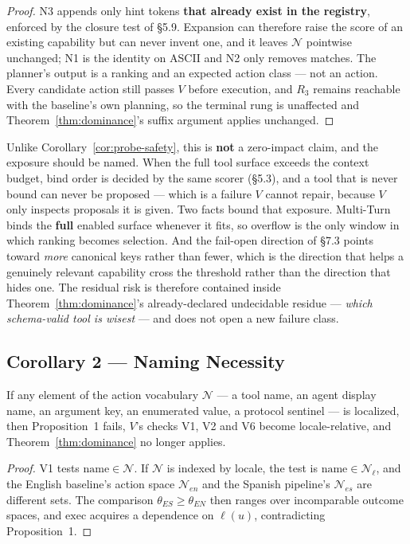 \begin{proof}
N3 appends only hint tokens \textbf{that already exist in the registry},
enforced by the closure test of \S5.9. Expansion can therefore raise the score
of an existing capability but can never invent one, and it leaves $\mathcal{N}$
pointwise unchanged; N1 is the identity on ASCII and N2 only removes matches.
The planner's output is a ranking and an expected action class --- not an
action. Every candidate action still passes $V$ before execution, and $R_3$
remains reachable with the baseline's own planning, so the terminal rung is
unaffected and Theorem~\ref{thm:dominance}'s suffix argument applies unchanged.
\end{proof}

Unlike Corollary~\ref{cor:probe-safety}, this is \textbf{not} a zero-impact
claim, and the exposure should be named. When the full tool surface exceeds the
context budget, bind order is decided by the same scorer (\S5.3), and a tool
that is never bound can never be proposed --- which is a failure $V$ cannot
repair, because $V$ only inspects proposals it is given. Two facts bound that
exposure. Multi-Turn binds the \textbf{full} enabled surface whenever it fits,
so overflow is the only window in which ranking becomes selection. And the
fail-open direction of \S7.3 points toward \emph{more} canonical keys rather
than fewer, which is the direction that helps a genuinely relevant capability
cross the threshold rather than the direction that hides one. The residual risk
is therefore contained inside Theorem~\ref{thm:dominance}'s already-declared
undecidable residue --- \emph{which schema-valid tool is wisest} --- and does
not open a new failure class.

\subsection{Corollary 2 --- Naming Necessity}
\label{sec:naming-necessity}

\begin{corollary}
\label{cor:naming}
If any element of the action vocabulary $\mathcal{N}$ --- a tool name, an agent
display name, an argument key, an enumerated value, a protocol sentinel --- is
localized, then Proposition~1 fails, $V$'s checks V1, V2 and V6 become
locale-relative, and Theorem~\ref{thm:dominance} no longer applies.
\end{corollary}

\begin{proof}
V1 tests $\mathrm{name} \in \mathcal{N}$. If $\mathcal{N}$ is indexed by locale,
the test is $\mathrm{name} \in \mathcal{N}_\ell$, and the English baseline's
action space $\mathcal{N}_{en}$ and the Spanish pipeline's $\mathcal{N}_{es}$
are different sets. The comparison $\theta_{ES} \ge \theta_{EN}$ then ranges
over incomparable outcome spaces, and $\mathrm{exec}$ acquires a dependence on
$\ell(u)$, contradicting Proposition~1.
\end{proof}

